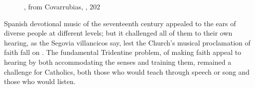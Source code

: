
\begin{figure}
    \caption{, from
    Covarrubias, , 202}
    \label{fig:Covarrubias-Emblemas-202-ears-thorns} 
\end{figure}

Spanish devotional music of the seventeenth century appealed to the ears of
diverse people at different levels; but it challenged all of them to
 their own hearing, as the Segovia villancicos say, lest the
Church's musical proclamation of faith fall on .
The fundamental Tridentine problem, of making faith appeal to hearing by both
accommodating the senses and training them, remained a challenge for Catholics,
both those who would teach through speech or song and those who would listen.

\endinput
